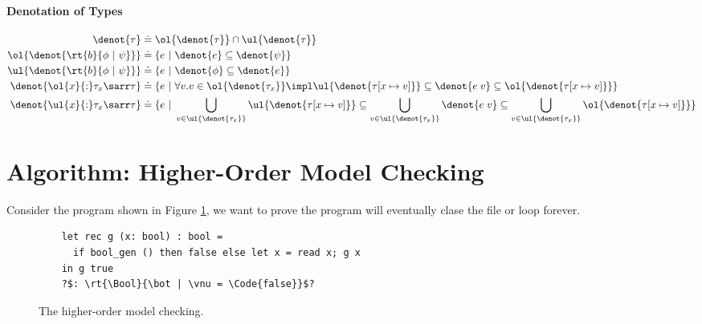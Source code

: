 \paragraph{Denotation of Types}
\begin{align*}
    \denot{\tau} &\doteq \ol{\denot{\tau}} \cap \ul{\denot{\tau}}
    \\\ol{\denot{\rt{b}{\phi ~|~ \psi}}} &\doteq \{e ~|~ \denot{e} \subseteq \denot{\psi} \}
    \\ \ul{\denot{\rt{b}{\phi ~|~ \psi}}} &\doteq \{e ~|~ \denot{\phi} \subseteq \denot{e} \}
    \\ \denot{\ol{x}{:}\tau_x \sarr \tau} &\doteq \{e ~|~ \forall v. v \in \ol{\denot{\tau_x}} \impl \ul{\denot{\tau[x\mapsto v]}} \subseteq \denot{e\;v} \subseteq \ol{\denot{\tau[x\mapsto v]}} \}
    \\ \denot{\ul{x}{:}\tau_x \sarr \tau} &\doteq \{e ~|~ \bigcup_{v \in \ul{\denot{\tau_x}}} \ul{\denot{\tau[x\mapsto v]}} \subseteq \bigcup_{v \in \ul{\denot{\tau_x}}} \denot{e\;v} \subseteq \bigcup_{v \in \ul{\denot{\tau_x}}} \ol{\denot{\tau[x\mapsto v]}} \}
\end{align*}\noindent


\section{Algorithm: Higher-Order Model Checking}

Consider the program shown in Figure \ref{fig:higher-order-model-checking}, we want to prove the program will eventually clase the file or loop forever.

\begin{figure}[!t]
    \begin{verbatim}
    let rec g (x: bool) : bool =
      if bool_gen () then false else let x = read x; g x
    in g true
    ?$: \rt{\Bool}{\bot | \vnu = \Code{false}}$?
    \end{verbatim}
    \caption{The higher-order model checking.}
    \label{fig:higher-order-model-checking}
\end{figure}

